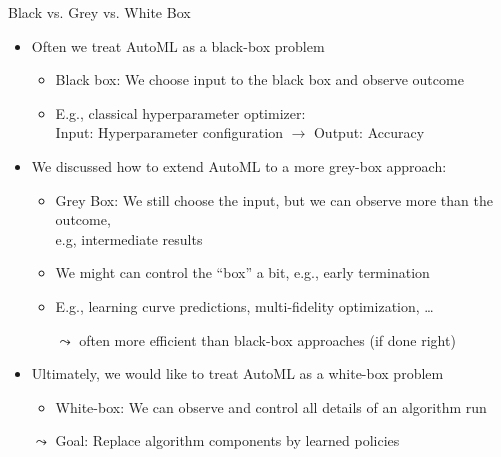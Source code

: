 \begin{frame}[c]{Black vs. Grey vs. White Box}

\begin{itemize}
	\item Often we treat AutoML as a \alert{black-box problem}
	\begin{itemize}
		\item Black box: We choose input to the black box and observe outcome
		\pause
		\item E.g., classical hyperparameter optimizer:\\ Input: Hyperparameter configuration $\to$ Output: Accuracy
	\end{itemize}
   \pause
   \smallskip
   \item We discussed how to extend AutoML to a more \alert{grey-box approach}:	
   \begin{itemize}
     	\item Grey Box: We still choose the input, but we can observe more than the outcome,\\ e.g, intermediate results
     	\pause
     	\item We might can control the ``box'' a bit,  e.g., early termination
     	\pause
        \item E.g., learning curve predictions, multi-fidelity optimization, \ldots
        \pause
        \item[$\leadsto$] often more efficient than black-box approaches (if done right)
   \end{itemize}
   \pause
   \smallskip
   \item Ultimately, we would like to treat AutoML as a \alert{white-box problem}
   \begin{itemize}
     	\item White-box: We can observe and control all details of an algorithm run
   \end{itemize}
	\pause
	\medskip
   \item[$\leadsto$] Goal: \alert{Replace algorithm components by learned policies}
\end{itemize}


\end{frame}
